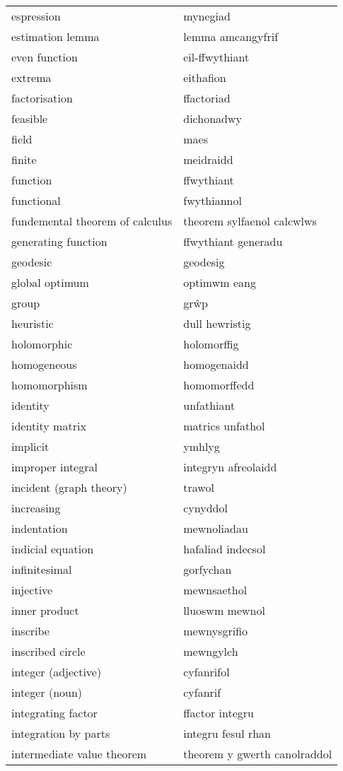 \begin{supertabular}{p{0.22\textwidth}p{0.22\textwidth}}
espression & mynegiad \\
estimation lemma & lemma amcangyfrif \\
even function & eil-ffwythiant \\
extrema & eithafion \\
factorisation & ffactoriad \\
feasible & dichonadwy \\
field & maes \\
finite & meidraidd \\
function & ffwythiant \\
functional & fwythiannol \\
fundemental theorem of calculus & theorem sylfaenol calcwlws \\
generating function & ffwythiant generadu \\
geodesic & geodesig \\
global optimum & optimwm eang \\
group & grŵp \\
heuristic & dull hewristig \\
holomorphic & holomorffig \\
homogeneous & homogenaidd \\
homomorphism & homomorffedd \\
identity & unfathiant \\
identity matrix & matrics unfathol \\
implicit & ymhlyg \\
improper integral & integryn afreolaidd \\
incident (graph theory) & trawol \\
increasing & cynyddol \\
indentation & mewnoliadau \\
indicial equation & hafaliad indecsol \\
infinitesimal & gorfychan \\
injective & mewnsaethol \\
inner product & lluoswm mewnol \\
inscribe & mewnysgrifio \\
inscribed circle & mewngylch \\
integer (adjective) & cyfanrifol \\
integer (noun) & cyfanrif \\
integrating factor & ffactor integru \\
integration by parts & integru fesul rhan \\
intermediate value theorem & theorem y gwerth canolraddol \\

\end{supertabular}
